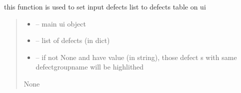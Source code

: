 \documentclass[letterpaper,10pt,english]{sphinxmanual}
\begin{document}
\begin{savenotes}\begin{fulllineitems}
\label{\detokenize{setting/backend/defect_management_funcs:oxin.backend.defect_management_funcs.set_defects_on_ui}}
\pysigstartsignatures
{}
\pysigstopsignatures
\sphinxAtStartPar
this function is used to set input defects list to defects table on ui
\begin{quote}\begin{description}
\begin{itemize}
\item {} 
\sphinxAtStartPar
{} – main ui object

\item {} 
\sphinxAtStartPar
{} – list of defects (in dict)

\item {} 
\sphinxAtStartPar
{} – if not None and have value (in string), those defect s with same defect\sphinxhyphen{}group\sphinxhyphen{}name will be highlithed

\end{itemize}

\sphinxAtStartPar
None

\end{description}\end{quote}

\end{fulllineitems}\end{savenotes}

\end{document}
